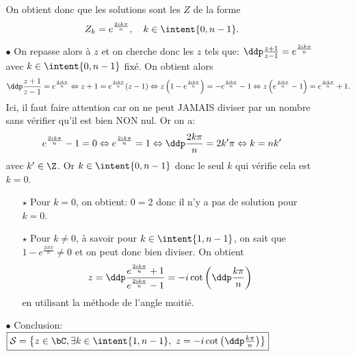 \begin{correction}
\begin{enumerate}
\begin{itemize}
\noindent On obtient donc que les solutions sont les $Z$ de la forme
$$Z_k=e^{\frac{2ik\pi}{n}},\quad k\in\intent{ 0,n-1}.$$
\item[$\bullet$] On repasse alors \`{a} $z$ et on cherche donc les $z$ tels que: $\ddp\frac{z+1}{z-1}=e^{\frac{2ik\pi}{n}}$ avec $k\in\intent{ 0,n-1}$ fix\'e. On obtient alors
$$\ddp\frac{z+1}{z-1}=e^{\frac{2ik\pi}{n}}\Leftrightarrow z+1=e^{\frac{2ik\pi}{n}} (z-1)\Leftrightarrow z\left(1- e^{\frac{2ik\pi}{n}} \right)=-e^{\frac{2ik\pi}{n}}-1\Leftrightarrow z\left(e^{\frac{2ik\pi}{n}} -1\right)=e^{\frac{2ik\pi}{n}}+1.$$
Ici, il faut faire attention car on ne peut JAMAIS diviser par un nombre sans v\'erifier qu'il est bien NON nul. Or on a:
$$e^{\frac{2ik\pi}{n}} -1=0\Leftrightarrow e^{\frac{2ik\pi}{n}} =1\Leftrightarrow \ddp\frac{2k\pi}{n}=2k^{\prime}\pi\Leftrightarrow k=nk^{\prime}$$
avec $k^{\prime}\in\Z$. Or $k\in\intent{ 0,n-1}$ donc le seul $k$ qui v\'erifie cela est $k=0$. 
\begin{itemize}
\item[$\star$] Pour $k=0$, on obtient: $0=2$ donc il n'y a pas de solution pour $k=0$.
\item[$\star$] Pour $k\not= 0$, \`{a} savoir pour $k\in\intent{ 1,n-1}$, on sait que $1- e^{\frac{2ik\pi}{n}}\not= 0$ et on peut donc bien diviser. On obtient
$$z=\ddp\frac{e^{\frac{2ik\pi}{n}}+1}{e^{\frac{2ik\pi}{n}} -1}=-i\cot{\left( \ddp\frac{k\pi}{n} \right)}$$
en utilisant la m\'ethode de l'angle moiti\'e.
\end{itemize}
\item[$\bullet$] Conclusion: $\fbox{$ \mathcal{S}=\left\lbrace  z\in\bC,\exists k\in\intent{ 1,n-1},\ z=-i\cot{\left( \ddp\frac{k\pi}{n} \right)}  \right\rbrace $}$
\end{itemize}
\end{enumerate}
\end{correction}